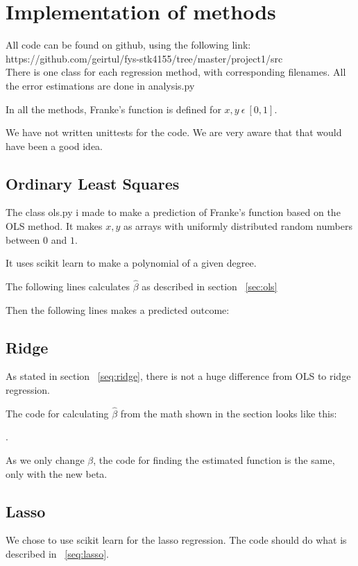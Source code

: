 \section{Implementation of methods}
All code can be found on github, using the following link:\\ 
https://github.com/geirtul/fys-stk4155/tree/master/project1/src\\

There is one class for each regression method, with corresponding 
filenames.
All the error estimations are done in analysis.py

In all the methods, Franke's function is defined for 
\(x,y \ \epsilon \ [0,1]\).

We have not written unittests for the code. We are very aware that 
that would have been a good idea. 

\subsection{Ordinary Least Squares}
The class ols.py i made to make a prediction of Franke's function
based on the OLS method. 
It makes \(x, y\) as arrays with uniformly distributed random numbers 
between \(0\) and \(1\). 

It uses scikit learn to make a polynomial of a given degree. 

The following lines calculates \(\hat{\beta}\) as described in 
section ~\ref{sec:ols} 



Then the following lines makes a predicted outcome:



\subsection{Ridge}
As stated in section ~\ref{seq:ridge}, there is 
not a huge difference from OLS to ridge regression. 

The code for calculating \(\hat{\beta}\) from the math  
shown in the section
looks like this: 

.

As we only change \(\beta\), the code for finding the estimated function 
is the same, only with the new beta. 

\subsection{Lasso}
We chose to use scikit learn for the lasso regression. The code should 
do what is described in ~\ref{seq:lasso}. 

